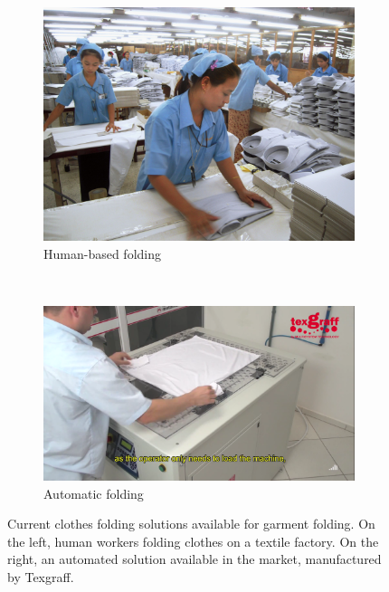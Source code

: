 \begin{figure}[htbp]
		\centering
        \begin{subfigure}[l]{0.42\textwidth}
            \centering
    		\includegraphics[width=\textwidth]
    		{figures/Intro_japan_folding.jpg}
			\caption{Human-based folding} %
        \end{subfigure}
        ~
        \begin{subfigure}[r]{0.56\textwidth}
	        \centering
    		\includegraphics[width=\textwidth]
    		{figures/Intro_industrial_folding.png}
		    \caption{Automatic folding}        
		\end{subfigure} 
		\caption[dummy]{Current clothes folding solutions available for garment folding. On the left, human workers folding clothes on a textile factory\footnotemark. On the right, an automated solution available in the market, manufactured by Texgraff.}
		\label{fig:global_conf_discovery_tripod}
\end{figure}



